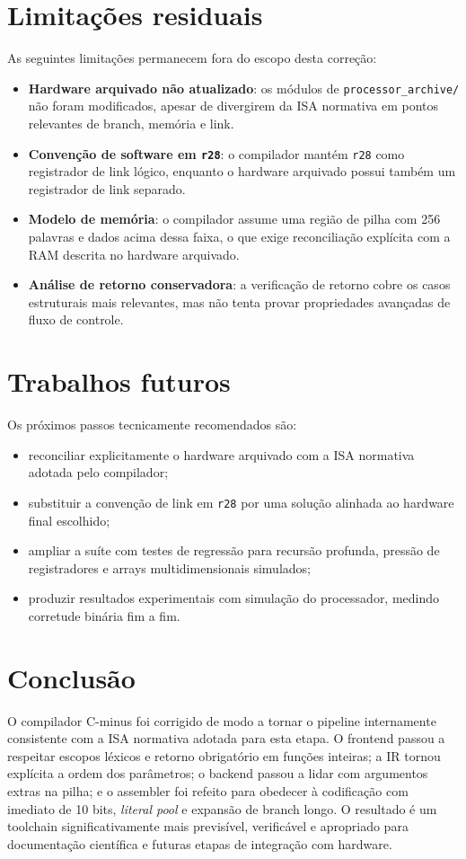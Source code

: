 \documentclass[12pt,a4paper]{article}
\begin{document}
\section{Limitações residuais}
\label{sec:limitacoes}
As seguintes limitações permanecem fora do escopo desta correção:
\begin{itemize}[leftmargin=1.5em]
    \item \textbf{Hardware arquivado não atualizado}: os módulos de \texttt{processor\_archive/} não foram modificados, apesar de divergirem da ISA normativa em pontos relevantes de branch, memória e link.
    \item \textbf{Convenção de software em \texttt{r28}}: o compilador mantém \texttt{r28} como registrador de link lógico, enquanto o hardware arquivado possui também um registrador de link separado.
    \item \textbf{Modelo de memória}: o compilador assume uma região de pilha com 256 palavras e dados acima dessa faixa, o que exige reconciliação explícita com a RAM descrita no hardware arquivado.
    \item \textbf{Análise de retorno conservadora}: a verificação de retorno cobre os casos estruturais mais relevantes, mas não tenta provar propriedades avançadas de fluxo de controle.
\end{itemize}

\section{Trabalhos futuros}
Os próximos passos tecnicamente recomendados são:
\begin{itemize}[leftmargin=1.5em]
    \item reconciliar explicitamente o hardware arquivado com a ISA normativa adotada pelo compilador;
    \item substituir a convenção de link em \texttt{r28} por uma solução alinhada ao hardware final escolhido;
    \item ampliar a suíte com testes de regressão para recursão profunda, pressão de registradores e arrays multidimensionais simulados;
    \item produzir resultados experimentais com simulação do processador, medindo corretude binária fim a fim.
\end{itemize}

\section{Conclusão}
O compilador C-minus foi corrigido de modo a tornar o pipeline internamente consistente com a ISA normativa adotada para esta etapa. O frontend passou a respeitar escopos léxicos e retorno obrigatório em funções inteiras; a IR tornou explícita a ordem dos parâmetros; o backend passou a lidar com argumentos extras na pilha; e o assembler foi refeito para obedecer à codificação com imediato de 10 bits, \emph{literal pool} e expansão de branch longo. O resultado é um toolchain significativamente mais previsível, verificável e apropriado para documentação científica e futuras etapas de integração com hardware.
\end{document}
